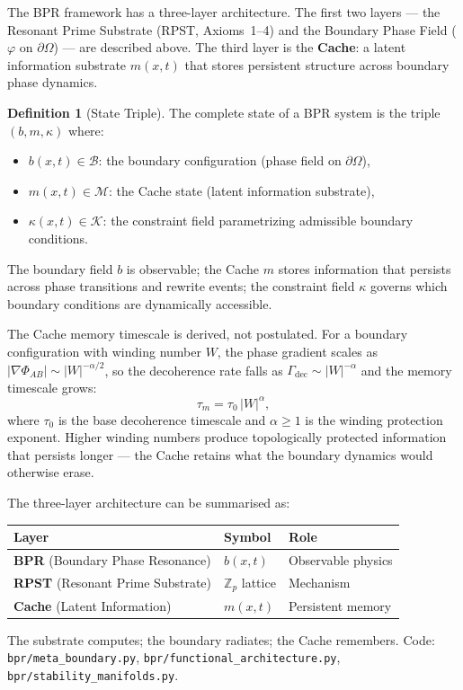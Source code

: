 \documentclass[12pt,oneside]{book}
\theoremstyle{definition}
\newtheorem{definition}{Definition}[chapter]
\begin{document}
The BPR framework has a three-layer architecture.  The first two layers --- the
Resonant Prime Substrate (RPST, Axioms~1--4) and the Boundary Phase Field
($\varphi$ on $\partial\Omega$) --- are described above.  The third layer is the
\textbf{Cache}: a latent information substrate $m(x,t)$ that stores persistent
structure across boundary phase dynamics.

\begin{definition}[State Triple]
  \label{def:state-triple}
  The complete state of a BPR system is the triple $(b, m, \kappa)$ where:
  \begin{itemize}
    \item $b(x,t) \in \mathcal{B}$: the boundary configuration (phase field on $\partial\Omega$),
    \item $m(x,t) \in \mathcal{M}$: the Cache state (latent information substrate),
    \item $\kappa(x,t) \in \mathcal{K}$: the constraint field parametrizing admissible boundary conditions.
  \end{itemize}
  The boundary field $b$ is observable; the Cache $m$ stores information that
  persists across phase transitions and rewrite events; the constraint field
  $\kappa$ governs which boundary conditions are dynamically accessible.
\end{definition}

The Cache memory timescale is derived, not postulated.  For a boundary
configuration with winding number $W$, the phase gradient scales as
$|\nabla\Phi_{AB}| \sim |W|^{-\alpha/2}$, so the decoherence rate falls as
$\Gamma_{\mathrm{dec}} \sim |W|^{-\alpha}$ and the memory timescale grows:
\begin{equation}
  \label{eq:cache-timescale}
  \tau_m = \tau_0\,|W|^\alpha,
\end{equation}
where $\tau_0$ is the base decoherence timescale and $\alpha \geq 1$ is the
winding protection exponent.  Higher winding numbers produce
topologically protected information that persists longer --- the Cache retains
what the boundary dynamics would otherwise erase.

\begin{resonance}
The three-layer architecture can be summarised as:
\begin{center}
\begin{tabular}{lll}
\toprule
\textbf{Layer} & \textbf{Symbol} & \textbf{Role} \\
\midrule
\textbf{BPR} (Boundary Phase Resonance) & $b(x,t)$ & Observable physics \\
\textbf{RPST} (Resonant Prime Substrate) & $\mathbb{Z}_p$ lattice & Mechanism \\
\textbf{Cache} (Latent Information) & $m(x,t)$ & Persistent memory \\
\bottomrule
\end{tabular}
\end{center}
The substrate computes; the boundary radiates; the Cache remembers.
Code: \texttt{bpr/meta\_boundary.py}, \texttt{bpr/functional\_architecture.py},
\texttt{bpr/stability\_manifolds.py}.
\end{resonance}
\end{document}
